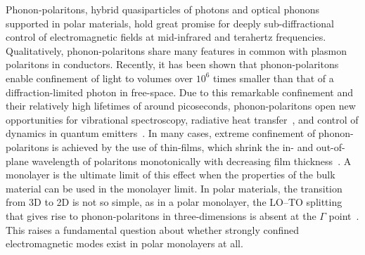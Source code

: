 \documentclass[aps,prb,twocolumn,
	           groupedaddress,superscriptaddress,
               amsfonts,amssymb,amsmath,floatfix,
	           citeautoscript]{revtex4-1}
\begin{document}
Phonon-polaritons, hybrid quasiparticles of photons and optical phonons supported in polar materials, hold great promise for deeply sub-diffractional control of electromagnetic fields at mid-infrared and terahertz frequencies. Qualitatively, phonon-polaritons share many features in common with plasmon polaritons in conductors. Recently, it has been shown that phonon-polaritons enable confinement of light to volumes over $10^6$ times smaller than that of a diffraction-limited photon in free-space\cite{caldwell2013low,xu2014mid,caldwell2014sub,dai2014tunable,tomadin2015accessing,yoxall2015direct,li2015hyperbolic,dai2015subdiffractional,dai2015graphene,caldwell2015low,li2016reversible,Basov:2016,basov2017towards,low2017polaritons,giles2017ultra,li2018infrared,ma2018plane}. Due to this remarkable confinement and their relatively high lifetimes of around picoseconds, phonon-polaritons open new opportunities for vibrational spectroscopy,\cite{autore2018boron} radiative heat transfer~\cite{hillenbrand2002phonon}, and control of dynamics in quantum emitters~\cite{kumar2015tunable,rivera2017making,kurman2018control}. 
In many cases, extreme confinement of phonon-polaritons is achieved by the use of thin-films, which shrink the in- and out-of-plane wavelength of polaritons monotonically with decreasing film thickness~\cite{dai2014tunable,dubrovkin2018ultra}. A monolayer is the ultimate limit of this effect when the properties of the bulk material can be used in the monolayer limit. In polar materials, the transition from 3D to 2D is not so simple, as in a polar monolayer, the LO--TO splitting that gives rise to phonon-polaritons in three-dimensions is absent at the $\Gamma$ point~\cite{sanchez2002vibrational,mele2002electric,serrano2007vibrational,sohier2017breakdown}. This raises a fundamental question about whether strongly confined electromagnetic modes exist in polar monolayers at all. 
\end{document}

